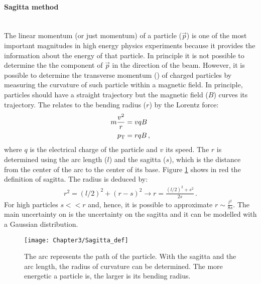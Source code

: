 \paragraph{Sagitta method}\mbox{}\\
\label{sec:Chap3:Reco:Sagitta}
The linear momentum (or just momentum) of a particle ($\overrightarrow{p}$) is one of the most important 
magnitudes in high energy physics experiments because it provides the information
about the energy of that particle. In principle it is not possible to determine the 
the component of $\overrightarrow{p}$ in the direction of the beam. However, 
it is possible to determine the transverse momentum (\pT) of charged particles
by measuring the curvature of such particle within a magnetic field. In principle,
particles should have a straight trajectory but the magnetic field ($B$) curves its trajectory.
The \pT relates to the bending radius ($r$) by the Lorentz force:
\begin{align*}
	m\frac{v^2}{r} & = vqB \\
	p_{\text{T}} &=rqB \, ,
\end{align*}
where $q$ is the electrical charge of the particle and $v$ its speed. The $r$ is determined using
the arc length ($l$) and 
the sagitta ($s$), which is the distance from the center of the arc to the center of its base. Figure \ref{fig:ChapReco:Sagitta} shows
in red the definition of sagitta. The radius is deduced by:
\begin{align*}
	r^{2}  = (l/2)^{2} + (r-s)^{2} \rightarrow r = \frac{(l/2)^2+s^2}{2s}\, .
\end{align*}
For high \pT particles $s << r$ and, hence, it is possible to approximate $r\sim\frac{l^2}{8s}$. 
The main uncertainty on \pT is the uncertainty on the sagitta and it can be
modelled with a Gaussian distribution.

\begin{figure}[h]
\centering
\texttt{[image: Chapter3/Sagitta\_def]}
\caption{The arc represents the path of the particle. With the sagitta and 
the arc length, the radius of curvature can be determined. The more energetic a
particle is, the larger is its bending radius.}
\label{fig:ChapReco:Sagitta}
\end{figure}



